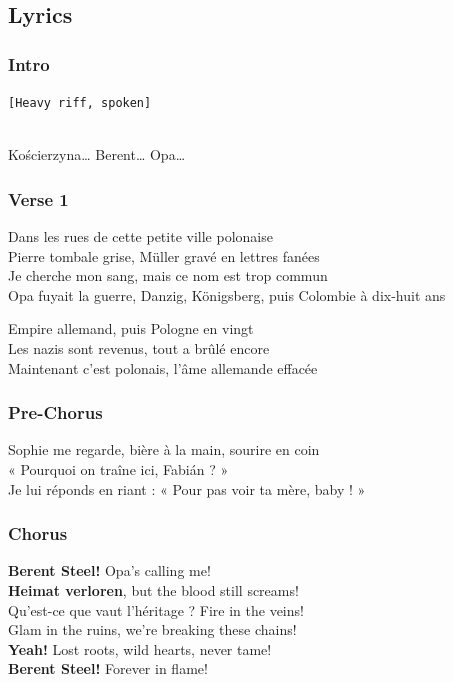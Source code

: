 \documentclass[]{article}
\begin{document}
\subsection{Lyrics}\label{lyrics-48}

\subsubsection{Intro}\label{intro-16}

\texttt{{[}Heavy\ riff,\ spoken{]}}\strut \\
Kościerzyna\ldots{} Berent\ldots{} Opa\ldots{}

\subsubsection{Verse 1}\label{verse-1-30}

Dans les rues de cette petite ville polonaise\\
Pierre tombale grise, Müller gravé en lettres fanées\\
Je cherche mon sang, mais ce nom est trop commun\\
Opa fuyait la guerre, Danzig, Königsberg, puis Colombie à dix-huit ans

Empire allemand, puis Pologne en vingt\\
Les nazis sont revenus, tout a brûlé encore\\
Maintenant c'est polonais, l'âme allemande effacée

\subsubsection{Pre-Chorus}\label{pre-chorus-58}

Sophie me regarde, bière à la main, sourire en coin\\
« Pourquoi on traîne ici, Fabián ? »\\
Je lui réponds en riant : « Pour pas voir ta mère, baby ! »

\subsubsection{Chorus}\label{chorus-86}

\textbf{Berent Steel!} Opa's calling me!\\
\textbf{Heimat verloren}, but the blood still screams!\\
Qu'est-ce que vaut l'héritage ? Fire in the veins!\\
Glam in the ruins, we're breaking these chains!\\
\textbf{Yeah!} Lost roots, wild hearts, never tame!\\
\textbf{Berent Steel!} Forever in flame!
\end{document}
